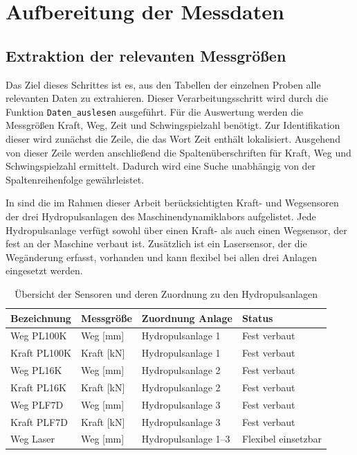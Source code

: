 	\section{Aufbereitung der Messdaten}
	\subsection{Extraktion der relevanten Messgrößen}
	Das Ziel dieses Schrittes ist es, aus den Tabellen der einzelnen Proben alle relevanten Daten zu extrahieren. Dieser Verarbeitungsschritt wird durch die Funktion \texttt{Daten\_auslesen} ausgeführt. Für die Auswertung werden die Messgrößen Kraft, Weg, Zeit und Schwingspielzahl benötigt. Zur Identifikation dieser wird zunächst die Zeile, die das Wort Zeit enthält lokalisiert. Ausgehend von dieser Zeile werden anschließend die Spaltenüberschriften für Kraft, Weg und Schwingspielzahl ermittelt. Dadurch wird eine Suche unabhängig von der Spaltenreihenfolge gewährleistet. 
	
	In  sind die im Rahmen dieser Arbeit berücksichtigten Kraft- und Wegsensoren der drei Hydropulsanlagen des Maschinendynamiklabors aufgelistet. Jede Hydropulsanlage verfügt sowohl über einen Kraft- als auch einen Wegsensor, der fest an der Maschine verbaut ist. Zusätzlich ist ein Lasersensor, der die Wegänderung erfasst, vorhanden und kann flexibel bei allen drei Anlagen eingesetzt werden.

\begin{table}[ht]
    \centering
    \caption{Übersicht der Sensoren und deren Zuordnung zu den Hydropulsanlagen}
    \label{tab:sensoren_uebersicht}
    \small
    \renewcommand{\arraystretch}{1.2} %
    \begin{tabular}{llll}
        \hline
        \textbf{Bezeichnung} & \textbf{Messgröße} & \textbf{Zuordnung Anlage} & \textbf{Status} \\
        \hline
        Weg PL100K   & Weg [mm]   & Hydropulsanlage 1 & Fest verbaut \\
        Kraft PL100K & Kraft [kN] & Hydropulsanlage 1 & Fest verbaut \\
        \hline
        Weg PL16K   & Weg [mm]   & Hydropulsanlage 2 & Fest verbaut \\
        Kraft PL16K & Kraft [kN] & Hydropulsanlage 2 & Fest verbaut \\
        \hline
        Weg PLF7D  & Weg [mm]   & Hydropulsanlage 3 & Fest verbaut \\
        Kraft PLF7D & Kraft [kN] & Hydropulsanlage 3 & Fest verbaut \\
        \hline
        Weg Laser   & Weg [mm]   & Hydropulsanlage 1--3 & Flexibel einsetzbar \\
        \hline
    \end{tabular}
\end{table}

